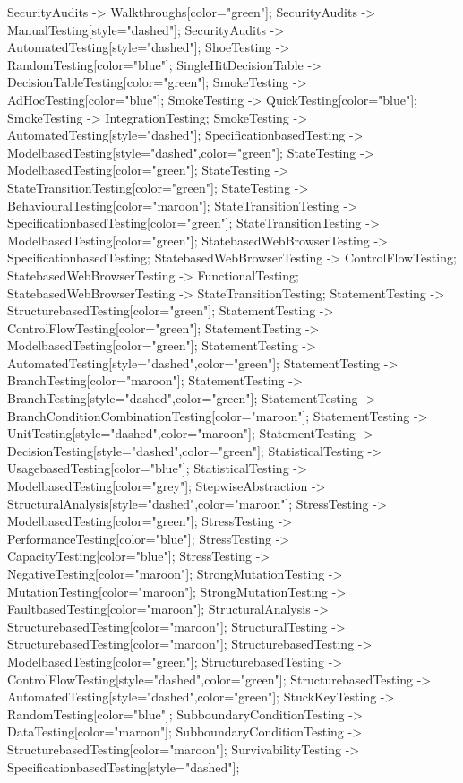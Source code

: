 \documentclass{article}
\begin{document}
{SecurityAudits -> Walkthroughs[color="green"];
SecurityAudits -> ManualTesting[style="dashed"];
SecurityAudits -> AutomatedTesting[style="dashed"];
ShoeTesting -> RandomTesting[color="blue"];
SingleHitDecisionTable -> DecisionTableTesting[color="green"];
SmokeTesting -> AdHocTesting[color="blue"];
SmokeTesting -> QuickTesting[color="blue"];
SmokeTesting -> IntegrationTesting;
SmokeTesting -> AutomatedTesting[style="dashed"];
SpecificationbasedTesting -> ModelbasedTesting[style="dashed",color="green"];
StateTesting -> ModelbasedTesting[color="green"];
StateTesting -> StateTransitionTesting[color="green"];
StateTesting -> BehaviouralTesting[color="maroon"];
StateTransitionTesting -> SpecificationbasedTesting[color="green"];
StateTransitionTesting -> ModelbasedTesting[color="green"];
StatebasedWebBrowserTesting -> SpecificationbasedTesting;
StatebasedWebBrowserTesting -> ControlFlowTesting;
StatebasedWebBrowserTesting -> FunctionalTesting;
StatebasedWebBrowserTesting -> StateTransitionTesting;
StatementTesting -> StructurebasedTesting[color="green"];
StatementTesting -> ControlFlowTesting[color="green"];
StatementTesting -> ModelbasedTesting[color="green"];
StatementTesting -> AutomatedTesting[style="dashed",color="green"];
StatementTesting -> BranchTesting[color="maroon"];
StatementTesting -> BranchTesting[style="dashed",color="green"];
StatementTesting -> BranchConditionCombinationTesting[color="maroon"];
StatementTesting -> UnitTesting[style="dashed",color="maroon"];
StatementTesting -> DecisionTesting[style="dashed",color="green"];
StatisticalTesting -> UsagebasedTesting[color="blue"];
StatisticalTesting -> ModelbasedTesting[color="grey"];
StepwiseAbstraction -> StructuralAnalysis[style="dashed",color="maroon"];
StressTesting -> ModelbasedTesting[color="green"];
StressTesting -> PerformanceTesting[color="blue"];
StressTesting -> CapacityTesting[color="blue"];
StressTesting -> NegativeTesting[color="maroon"];
StrongMutationTesting -> MutationTesting[color="maroon"];
StrongMutationTesting -> FaultbasedTesting[color="maroon"];
StructuralAnalysis -> StructurebasedTesting[color="maroon"];
StructuralTesting -> StructurebasedTesting[color="maroon"];
StructurebasedTesting -> ModelbasedTesting[color="green"];
StructurebasedTesting -> ControlFlowTesting[style="dashed",color="green"];
StructurebasedTesting -> AutomatedTesting[style="dashed",color="green"];
StuckKeyTesting -> RandomTesting[color="blue"];
SubboundaryConditionTesting -> DataTesting[color="maroon"];
SubboundaryConditionTesting -> StructurebasedTesting[color="maroon"];
SurvivabilityTesting -> SpecificationbasedTesting[style="dashed"];
}
\end{document}

